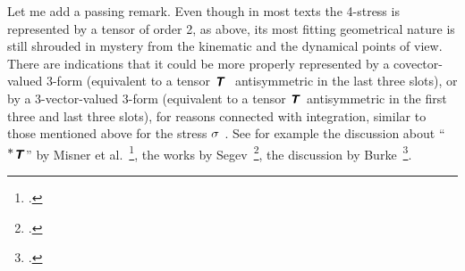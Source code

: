 \documentclass[\ifafour a4paper,12pt,\else a5paper,10pt,\fi%
onecolumn,oneside,article,%
british%
]{memoir}
\makeatletter
\newcommand*{\defquote}[1]{`\,#1\,'}
\theoremstyle{remark}
\theoremstyle{innote}
\newcommand*{\mathte}[1]{\textbf{\textit{\textsf{#1}}}}
\newcommand*{\citep}{\footcites}
\newcommand*{\amp}{\&}
\newcommand*{\de}{\partialup}%
\newcommand*{\di}{\mathrm{d}}%
\DeclareMathOperator{\tr}{tr}%
\renewcommand*{\|}[1][]{\nonscript\,#1\vert\nonscript\;\mathopen{}}
\newcommand*{\sect}{\S}%
\newcommand*{\chap}{ch.}%
\newcommand*{\etal}{{et al.}}
\newcommand*{\q}{}%
\DeclareRobustCommand*{\q}{%
  \mathbin{\mathpalette\bigcdot@{}}%
}
\newcommand*{\bigcdot@scalefactor}{0.7}
\newcommand*{\bigcdot@widthfactor}{1.5}
\newcommand*{\bigcdot@}[2]{%
  \sbox0{$#1\vcenter{}$}%
  \sbox2{$#1\cdot\m@th$}%
  \hbox to \bigcdot@widthfactor\wd2{%
    \hfil
    \raise\ht0\hbox{%
      \scalebox{\bigcdot@scalefactor}{%
        \lower\ht0\hbox{$#1\bullet\m@th$}%
      }%
    }%
    \hfil
  }%
}
\newcommand*{\yT}{\mathte{T}}
\renewcommand*{\i}{\indices}
\newcommand*{\dex}[1][i]{\frac{\de}{\de x^{#1}}}
\newcommand*{\dix}[1][i]{\di x^{#1}}
\newcommand*{\nab}{\nabla}
\newcommand*{\yt}{\sigma}
\makeatother
\begin{document}

\medskip




Let me add a passing remark. Even though in most texts the 4-stress is
represented by a tensor of order 2, as above, its most fitting geometrical
nature is still shrouded in mystery from the kinematic and the dynamical
points of view. There are indications that it could be more properly
represented by a covector-valued 3-form (equivalent to a tensor
$\yT\i{_{\q\ \q\q\q}}$ antisymmetric in the last three slots), or by a
3-vector-valued 3-form (equivalent to a tensor $\yT\i{^{\q\q\q}_{\q\q\q}}$
antisymmetric in the first three and last three slots), for reasons
connected with integration, similar to those mentioned above for the stress
$\yt\i{_{\q\ \q\q}}$. See for example the discussion about
\enquote{$^{\displaystyle *}\mathte{T}$} by Misner
\etal~\citep[\chap~15]{misneretal1970_r1973}, the works by
Segev~\citep{segev2002,segev1986,segevetal1999,segev2000,segev2000b}, the
discussion by Burke~\citep[\sect~41]{burke1985_r1987}.





\end{document}

